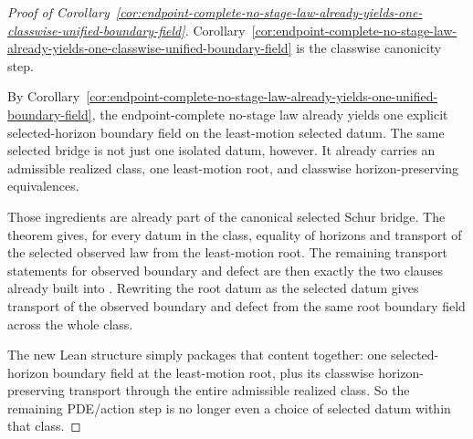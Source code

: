 \begin{proof}[Proof of Corollary~\ref{cor:endpoint-complete-no-stage-law-already-yields-one-classwise-unified-boundary-field}]
\label{proof:cor:endpoint-complete-no-stage-law-already-yields-one-classwise-unified-boundary-field}
Corollary~\ref{cor:endpoint-complete-no-stage-law-already-yields-one-classwise-unified-boundary-field}
is the classwise canonicity step.

By Corollary~\ref{cor:endpoint-complete-no-stage-law-already-yields-one-unified-boundary-field},
the endpoint-complete no-stage law already yields one explicit selected-horizon
boundary field on the least-motion selected datum. The same selected bridge is
not just one isolated datum, however. It already carries an admissible realized
class, one least-motion root, and classwise horizon-preserving equivalences.

Those ingredients are already part of the canonical selected Schur bridge. The
theorem  gives, for every datum in
the class, equality of horizons and transport of the selected observed law from
the least-motion root. The remaining transport statements for observed boundary
and defect are then exactly the two clauses already built into
. Rewriting the root datum as the selected
datum gives transport of the observed boundary and defect from the same root
boundary field across the whole class.

The new Lean structure  simply
packages that content together: one selected-horizon boundary field at the
least-motion root, plus its classwise horizon-preserving transport through the
entire admissible realized class. So the remaining PDE/action step is no
longer even a choice of selected datum within that class.
\end{proof}

